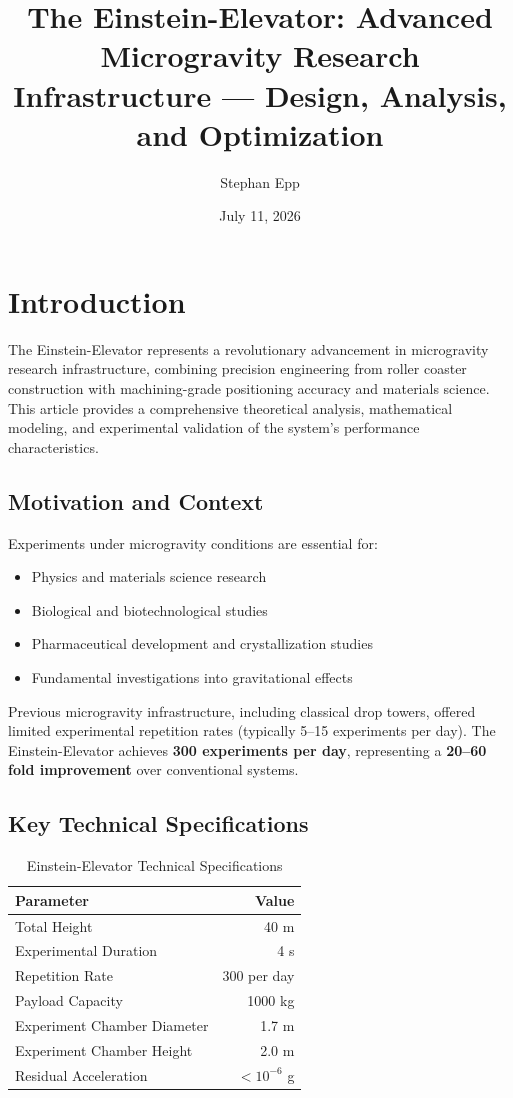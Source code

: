 ﻿\documentclass[a4paper,12pt]{article}
\title{The Einstein-Elevator: Advanced Microgravity Research Infrastructure --- Design, Analysis, and Optimization}
\author{Stephan Epp}
\date{July 11, 2026}
\theoremstyle{definition}
\begin{document}
	
\maketitle

\tableofcontents
\newpage

\section{Introduction}

The Einstein-Elevator represents a revolutionary advancement in microgravity research infrastructure, combining precision engineering from roller coaster construction with machining-grade positioning accuracy and materials science. This article provides a comprehensive theoretical analysis, mathematical modeling, and experimental validation of the system's performance characteristics.

\subsection{Motivation and Context}

Experiments under microgravity conditions are essential for:
\begin{itemize}
	\item Physics and materials science research
	\item Biological and biotechnological studies
	\item Pharmaceutical development and crystallization studies
	\item Fundamental investigations into gravitational effects
\end{itemize}

Previous microgravity infrastructure, including classical drop towers, offered limited experimental repetition rates (typically 5--15 experiments per day). The Einstein-Elevator achieves \textbf{300 experiments per day}, representing a \textbf{20--60 fold improvement} over conventional systems.

\subsection{Key Technical Specifications}

\begin{table}[h]
\centering
\begin{tabular}{|l|r|}
\hline
\textbf{Parameter} & \textbf{Value} \\
\hline
Total Height & 40 m \\
Experimental Duration & 4 s \\
Repetition Rate & 300 per day \\
Payload Capacity & 1000 kg \\
Experiment Chamber Diameter & 1.7 m \\
Experiment Chamber Height & 2.0 m \\
Residual Acceleration & $< 10^{-6}$ g \\
\hline
\end{tabular}
\caption{Einstein-Elevator Technical Specifications}
\end{table}
\end{document}
